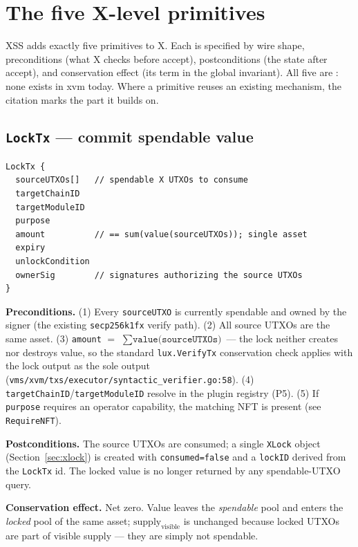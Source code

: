 \section{The five X-level primitives}
\label{sec:primitives}

XSS adds exactly five primitives to X. Each is specified by wire shape,
preconditions (what X checks before accept), postconditions (the state
after accept), and conservation effect (its term in the global
invariant). All five are \DESIGN{}: none exists in xvm today. Where a
primitive reuses an existing mechanism, the citation marks the
\IMPL{} part it builds on.

\subsection{\texttt{LockTx} --- commit spendable value}

\begin{lstlisting}
LockTx {
  sourceUTXOs[]   // spendable X UTXOs to consume
  targetChainID
  targetModuleID
  purpose
  amount          // == sum(value(sourceUTXOs)); single asset
  expiry
  unlockCondition
  ownerSig        // signatures authorizing the source UTXOs
}
\end{lstlisting}

\textbf{Preconditions.} (1) Every \texttt{sourceUTXO} is currently
spendable and owned by the signer (the existing
\texttt{secp256k1fx} verify path). (2) All source UTXOs are the same
asset. (3) \texttt{amount} $=$ $\sum \texttt{value(sourceUTXOs)}$ ---
the lock neither creates nor destroys value, so the standard
\texttt{lux.VerifyTx} conservation check applies with the lock output as
the sole output
(\texttt{vms/xvm/txs/executor/syntactic\_verifier.go:58}). (4)
\texttt{targetChainID}/\texttt{targetModuleID} resolve in the plugin
registry (P5). (5) If \texttt{purpose} requires an operator capability,
the matching NFT is present (see \texttt{RequireNFT}).

\textbf{Postconditions.} The source UTXOs are consumed; a single
\texttt{XLock} object (Section~\ref{sec:xlock}) is created with
\texttt{consumed=false} and a \texttt{lockID} derived from the
\texttt{LockTx} id. The locked value is no longer returned by any
spendable-UTXO query.

\textbf{Conservation effect.} Net zero. Value leaves the
\emph{spendable} pool and enters the \emph{locked} pool of the same
asset; $\mathrm{supply}_{\text{visible}}$ is unchanged because locked
UTXOs are part of visible supply --- they are simply not spendable.

